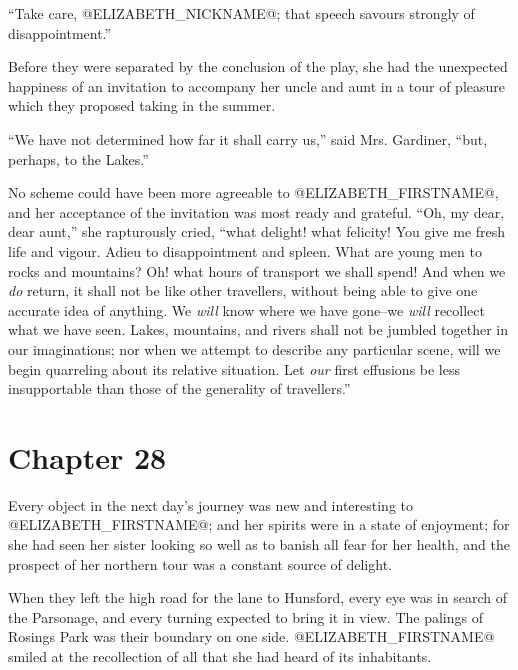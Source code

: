 ``Take care, @ELIZABETH_NICKNAME@; that speech savours strongly of disappointment.''

Before they were separated by the conclusion of the play, she had the
unexpected happiness of an invitation to accompany her uncle and aunt in
a tour of pleasure which they proposed taking in the summer.

``We have not determined how far it shall carry us,'' said Mrs. Gardiner,
``but, perhaps, to the Lakes.''

No scheme could have been more agreeable to @ELIZABETH_FIRSTNAME@, and her
acceptance of the invitation was most ready and grateful. ``Oh, my dear,
dear aunt,'' she rapturously cried, ``what delight! what felicity! You
give me fresh life and vigour. Adieu to disappointment and spleen. What
are young men to rocks and mountains? Oh! what hours of transport
we shall spend! And when we \textit{do} return, it shall not be like other
travellers, without being able to give one accurate idea of anything. We
\textit{will} know where we have gone--we \textit{will} recollect what we have seen.
Lakes, mountains, and rivers shall not be jumbled together in our
imaginations; nor when we attempt to describe any particular scene,
will we begin quarreling about its relative situation. Let \textit{our}
first effusions be less insupportable than those of the generality of
travellers.''



\chapter*{Chapter 28}


Every object in the next day's journey was new and interesting to
@ELIZABETH_FIRSTNAME@; and her spirits were in a state of enjoyment; for she had
seen her sister looking so well as to banish all fear for her health,
and the prospect of her northern tour was a constant source of delight.

When they left the high road for the lane to Hunsford, every eye was in
search of the Parsonage, and every turning expected to bring it in view.
The palings of Rosings Park was their boundary on one side. @ELIZABETH_FIRSTNAME@
smiled at the recollection of all that she had heard of its inhabitants.

